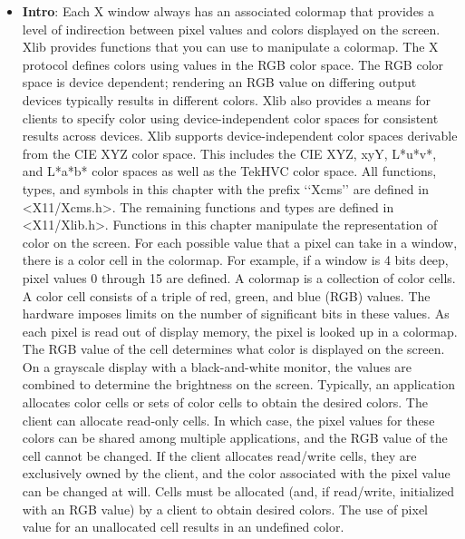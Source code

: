 \documentclass{report}
\begin{document}
    \pagebreak 
    \begin{itemize}
        \item \textbf{Intro}: Each X window always has an associated colormap that provides a level of indirection between pixel values and colors displayed on the screen. Xlib provides functions that you can use to manipulate a colormap. The X protocol defines colors using values in the RGB color space. The RGB color space is device dependent; rendering an RGB value on differing output devices typically results in different colors. Xlib also provides a means for clients to specify color using device-independent color spaces for consistent results across devices. Xlib supports device-independent color spaces derivable from the CIE XYZ color space. This includes the CIE XYZ, xyY, L*u*v*, and L*a*b* color spaces as well as the TekHVC color space. 
            \bigbreak \noindent 
            All functions, types, and symbols in this chapter with the prefix ‘‘Xcms’’ are defined in <X11/Xcms.h>. The remaining functions and types are defined in <X11/Xlib.h>.
            \bigbreak \noindent 
            Functions in this chapter manipulate the representation of color on the screen. For each possible value that a pixel can take in a window, there is a color cell in the colormap. For example, if a window is 4 bits deep, pixel values 0 through 15 are defined. A colormap is a collection of color cells. A color cell consists of a triple of red, green, and blue (RGB) values. The hardware imposes limits on the number of significant bits in these values. As each pixel is read out of display memory, the pixel is looked up in a colormap. The RGB value of the cell determines what color is displayed on the screen. On a grayscale display with a black-and-white monitor, the values are combined to determine the brightness on the screen.
            \bigbreak \noindent 
            Typically, an application allocates color cells or sets of color cells to obtain the desired colors. The client can allocate read-only cells. In which case, the pixel values for these colors can be shared among multiple applications, and the RGB value of the cell cannot be changed. If the client allocates read/write cells, they are exclusively owned by the client, and the color associated with the pixel value can be changed at will. Cells must be allocated (and, if read/write, initialized with an RGB value) by a client to obtain desired colors. The use of pixel value for an unallocated cell results in an undefined color.
            \bigbreak \noindent 

\end{itemize}
\end{document}
